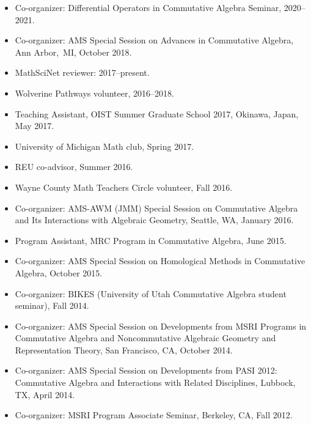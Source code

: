\documentclass[12pt]{amsart}
\begin{document}
\begin{itemize}[leftmargin=9mm]
	\item Co-organizer: Differential Operators in Commutative Algebra Seminar, 2020--2021.
	\item Co-organizer: AMS Special Session on Advances in Commutative Algebra, Ann Arbor,~MI, October 2018.
	\item MathSciNet reviewer: 2017--present.
	\item Wolverine Pathways volunteer, 2016--2018.
	\item Teaching Assistant, OIST Summer Graduate School 2017, Okinawa, Japan, May 2017.
	\item University of Michigan Math club, Spring 2017.
	\item REU co-advisor, Summer 2016.
	\item Wayne County Math Teachers Circle volunteer, Fall 2016.
	\item Co-organizer: AMS-AWM (JMM) Special Session on Commutative Algebra and Its Interactions with Algebraic Geometry, Seattle, WA, January 2016.
	\item Program Assistant, MRC Program in Commutative Algebra, June 2015.
	\item  Co-organizer: AMS Special Session on Homological Methods in Commutative Algebra, October 2015.
	\item Co-organizer: BIKES (University of Utah Commutative Algebra student seminar), Fall 2014.
	\item Co-organizer: AMS Special Session on Developments from MSRI Programs in Commutative \mbox{Algebra} and Noncommutative Algebraic Geometry and Representation Theory, San Francisco, CA, October 2014.
	\item Co-organizer: AMS Special Session on Developments from PASI 2012: Commutative Algebra and Interactions with Related Disciplines, Lubbock, TX, April 2014.
	\item Co-organizer: MSRI Program Associate Seminar, Berkeley, CA, Fall 2012.
\end{itemize}
\end{document}
